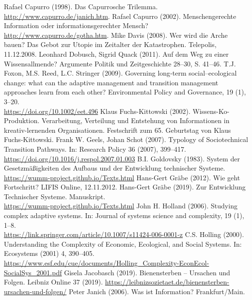 \documentclass[11pt,a4paper]{article}
\begin{document}
\begin{thebibliography}{xxx}
 Rafael Capurro (1998). Das Capurrosche Trilemma.
  \url{http://www.capurro.de/janich.htm}.
 Rafael Capurro (2002). Menschengerechte Information oder
  informationsgerechter Mensch? \url{http://www.capurro.de/gotha.htm}.
 Mike Davis (2008). Wer wird die Arche bauen?  Das Gebot
  zur Utopie im Zeitalter der Katastrophen.  Telepolis, 11.12.2008.
 Leonhard Dobusch, Sigrid Quack (2011). Auf dem Weg zu
  einer Wissensallmende? Argumente Politik und Zeitgeschichte 28--30,
  S. 41--46.
 T.J. Foxon, M.S. Reed, L.C. Stringer (2009). Governing
  long‐term social–ecological change: what can the adaptive management and
  transition management approaches learn from each other? Environmental Policy
  and Governance, 19 (1), 3--20.\\ \url{https://doi.org/10.1002/eet.496}
 Klaus Fuchs-Kittowski (2002). Wissens-Ko-Produktion.
  Verarbeitung, Verteilung und Entstehung von Informationen in
  kreativ-lernenden Organisationen.  Festschrift zum 65. Geburtstag von Klaus
  Fuchs-Kittowski.
 Frank W. Geels, Johan Schot (2007). Typology of
  Sociotechnical Transition Pathways. In: Research Policy 36 (2007),
  399–417.\\ \url{https://doi.org/10.1016/j.respol.2007.01.003}
 B.I. Goldovsky (1983). System der Gesetzmäßigkeiten
  des Aufbaus und der Entwicklung technischer Systeme.
  \url{https://wumm-project.github.io/Texts.html}
 Hans-Gert Gräbe (2012). Wie geht Fortschritt? LIFIS
  Online, 12.11.2012.
 Hans-Gert Gräbe (2019). Zur Entwicklung Technischer
  Systeme.  Manuskript. \\ \url{https://wumm-project.github.io/Texts.html}
 John H. Holland (2006). Studying complex adaptive
  systems. In: Journal of systems science and complexity, 19 (1),
  1–8.\\ \url{https://link.springer.com/article/10.1007/s11424-006-0001-z}
 C.S. Holling (2000). Understanding the Complexity of
  Economic, Ecological, and Social Systems. In: Ecosystems (2001) 4, 390–405.
  \url{https://www.esf.edu/cue/documents/Holling_Complexity-EconEcol-SocialSys_2001.pdf}
 Gisela Jacobasch (2019). Bienensterben -- Ursachen und
  Folgen.  Leibniz Online 37 (2019).
  \url{https://leibnizsozietaet.de/bienensterben-ursachen-und-folgen/}
 Peter Janich (2006). Was ist Information?
  Frankfurt/Main.

\end{thebibliography}
\end{document}
